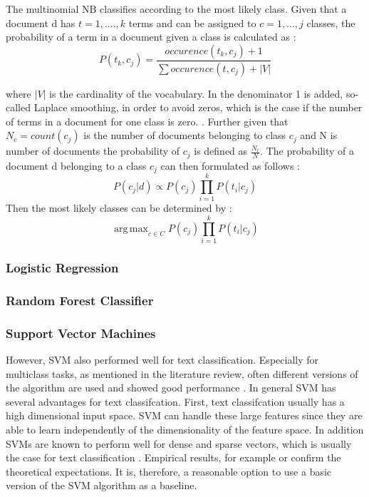 \documentclass[12pt, a4paper, titlepage]{article}
\DeclareMathOperator*{\argmax}{arg\,max}
\begin{document}
The multinomial \ac{NB} classifies according to the most likely class. Given that a document d has $t = 1, ...., k$ terms and can be assigned to $c = 1,...,j$ classes, the probability of a term in a document given a class is calculated as \citep{Manning2008}:
\[ P(t_k, c_j) = \frac{occurence(t_k, c_j) + 1}{\sum occurence(t, c_j) + |V|} \]

where $|V|$ is the cardinality of the vocabulary. In the denominator 1 is added, so-called Laplace smoothing, in order to avoid zeros, which is the case if the number of terms in a document for one class is zero. \citep{Manning2008}. Further given that $N_c = count(c_j)$ is the number of documents belonging to class $c_j$ and N is number of documents the probability of $c_j$ is defined as $\frac{N_c}{N}$. The probability of a document d belonging to a class $c_j$ can then formulated as follows \citep[258]{Manning2008}:
\[ P(c_j|d) \propto P(c_j) \prod_{i = 1}^k P(t_i|c_j) \]
Then the most likely classes can be determined by \citep{Manning2008}: 
\[\argmax_{c \in C} P(c_j) \prod_{i = 1}^k P(t_i|c_j) \] 

\subsubsection{Logistic Regression}

\subsubsection{Random Forest Classifier}

\subsubsection{Support Vector Machines}
However, \ac{SVM} also performed well for text classification. Especially for multiclass tasks, as mentioned in the literature review, often different versions of the algorithm are used and showed good performance \citep{Aiolli2005,Angulo2003,Benabdeslem2006,Guo2015,Mayoraz1999,Tang2019,Tomar2015}. In general \ac{SVM} has several advantages for text classifcation. First, text classifcation usually has a high dimensional input space. \ac{SVM} can handle these large features since they are able to learn independently of the dimensionality of the feature space. In addition \ac{SVM}s are known to perform well for dense and sparse vectors, which is usually the case for text classification \citep{Joachims1998}. Empirical results, for example \citet{Joachims1998} or \cite{Liu2010} confirm the theoretical expectations. It is, therefore, a reasonable option to use a basic version of the \ac{SVM} algorithm as a baseline.
\end{document}

